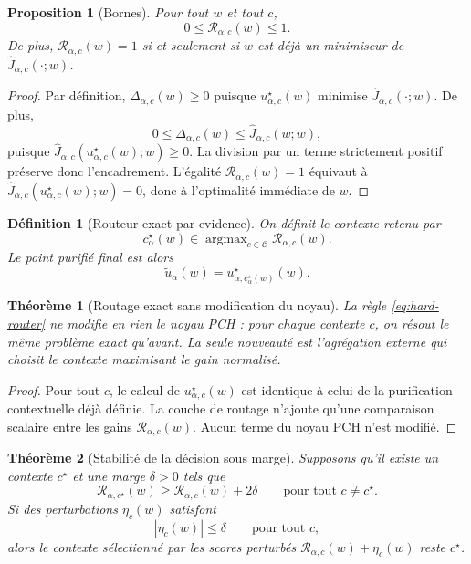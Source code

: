 \documentclass[11pt,a4paper]{article}
\newtheorem{definition}{Définition}[section]
\newtheorem{proposition}{Proposition}[section]
\newtheorem{theorem}{Théorème}[section]
\DeclareMathOperator{\argmax}{argmax}
\newcommand{\Ccal}{\mathcal C}
\begin{document}
\begin{proposition}[Bornes]
Pour tout \(w\) et tout \(c\),
\[
0\le \mathcal R_{\alpha,c}(w)\le 1.
\]
De plus, \(\mathcal R_{\alpha,c}(w)=1\) si et seulement si \(w\) est déjà un minimiseur de \(\widehat J_{\alpha,c}(\cdot;w)\).
\end{proposition}

\begin{proof}
Par définition, \(\Delta_{\alpha,c}(w)\ge 0\) puisque \(u^\star_{\alpha,c}(w)\) minimise \(\widehat J_{\alpha,c}(\cdot;w)\).
De plus,
\[
0\le \Delta_{\alpha,c}(w)\le \widehat J_{\alpha,c}(w;w),
\]
puisque \(\widehat J_{\alpha,c}(u^\star_{\alpha,c}(w);w)\ge 0\).
La division par un terme strictement positif préserve donc l'encadrement.
L'égalité \(\mathcal R_{\alpha,c}(w)=1\) équivaut à \(\widehat J_{\alpha,c}(u^\star_{\alpha,c}(w);w)=0\), donc à l'optimalité immédiate de \(w\).
\end{proof}

\begin{definition}[Routeur exact par evidence]
On définit le contexte retenu par
\begin{equation}\label{eq:hard-router}
c^\star_\alpha(w)\in
\argmax_{c\in\Ccal}\mathcal R_{\alpha,c}(w).
\end{equation}
Le point purifié final est alors
\[
\widetilde u_\alpha(w)=u^\star_{\alpha,c^\star_\alpha(w)}(w).
\]
\end{definition}

\begin{theorem}[Routage exact sans modification du noyau]
La règle \eqref{eq:hard-router} ne modifie en rien le noyau PCH :
pour chaque contexte \(c\), on résout le même problème exact qu'avant.
La seule nouveauté est l'agrégation externe qui choisit le contexte maximisant le gain normalisé.
\end{theorem}

\begin{proof}
Pour tout \(c\), le calcul de \(u^\star_{\alpha,c}(w)\) est identique à celui de la purification contextuelle déjà définie.
La couche de routage n'ajoute qu'une comparaison scalaire entre les gains \(\mathcal R_{\alpha,c}(w)\).
Aucun terme du noyau PCH n'est modifié.
\end{proof}

\begin{theorem}[Stabilité de la décision sous marge]
\label{thm:margin-stability}
Supposons qu'il existe un contexte \(c^\star\) et une marge \(\delta>0\) tels que
\[
\mathcal R_{\alpha,c^\star}(w)\ge \mathcal R_{\alpha,c}(w)+2\delta
\qquad\text{pour tout }c\neq c^\star.
\]
Si des perturbations \(\eta_c(w)\) satisfont
\[
|\eta_c(w)|\le \delta\qquad\text{pour tout }c,
\]
alors le contexte sélectionné par les scores perturbés
\(\mathcal R_{\alpha,c}(w)+\eta_c(w)\) reste \(c^\star\).
\end{theorem}
\end{document}
